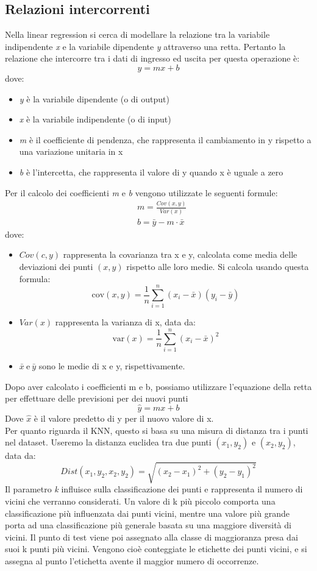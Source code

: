 \documentclass[11pt]{article}
\theoremstyle{definition}
\begin{document}
\subsection{Relazioni intercorrenti}
Nella linear regression si cerca di modellare la relazione tra la variabile indipendente \textit{x} e la variabile dipendente \textit{y} attraverso una retta. Pertanto la relazione che intercorre tra i dati di ingresso ed uscita per questa operazione è:
$$
y=mx+b
$$
dove:
\begin{itemize}
\item \textit{y} è la variabile dipendente (o di output)
\item \textit{x} è la variabile indipendente (o di input)
\item \textit{m} è il coefficiente di pendenza, che rappresenta il cambiamento in y rispetto a una variazione unitaria in x
\item \textit{b} è l'intercetta, che rappresenta il valore di y quando x è uguale a zero
\end{itemize}
Per il calcolo dei coefficienti \textit{m} e \textit{b} vengono utilizzate le seguenti formule:
\begin{align*}
&m = \frac{Cov(x,y)}{Var(x)}\\
&b=\bar{y}-m\cdot \bar{x}
\end{align*}
dove:
\begin{itemize}
\item $Cov(c,y)$ rappresenta la covarianza tra x e y, calcolata come media delle deviazioni dei punti $(x,y)$ rispetto alle loro medie. Si calcola usando questa formula:
$$
\text{cov}(x, y) = \frac{1}{n} \sum_{i=1}^{n} (x_i - \bar{x})(y_i - \bar{y})
$$
\item $Var(x)$ rappresenta la varianza di x, data da:
$$
\text{var}(x) = \frac{1}{n} \sum_{i=1}^{n} (x_i - \bar{x})^2
$$
\item $\bar{x} \ \text{e} \ \bar{y}$ sono le medie di x e y, rispettivamente.
\end{itemize}
Dopo aver calcolato i coefficienti m e b, possiamo utilizzare l'equazione della retta per effettuare delle previsioni per dei nuovi punti
$$
\hat{y} = mx+b
$$
Dove $\hat{x}$ è il valore predetto di y per il nuovo valore di x.\\
\newline
Per quanto riguarda il KNN, questo si basa su una misura di distanza tra i punti nel dataset. Useremo la distanza euclidea tra due punti $(x_1,y_2)$ e $(x_2,y_2)$, data da:
$$
Dist(x_1,y_2,x_2,y_2)=\sqrt{(x_2-x_1)^2 + (y_2-y_1)^2}
$$ 
Il parametro \textit{k} influisce sulla classificazione dei punti e rappresenta il numero di vicini che verranno considerati. Un valore di k più piccolo comporta una classificazione più influenzata dai punti vicini, mentre una valore più grande porta ad una classificazione più generale basata su una maggiore diversità di vicini. Il punto di test viene poi assegnato alla classe di maggioranza presa dai suoi k punti più vicini. Vengono cioè conteggiate le etichette dei punti vicini, e si assegna al punto l'etichetta avente il maggior numero di occorrenze.
\end{document}
